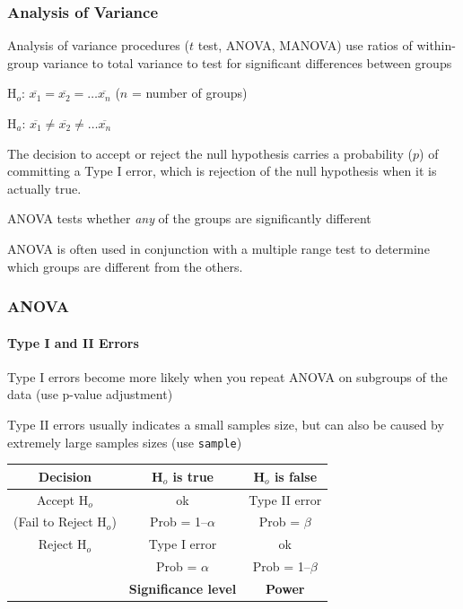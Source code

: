 \documentclass[10pt]{beamer}
\begin{document}
\begin{frame}
\frametitle{Analysis of Variance}

\bi
\item Analysis of variance procedures ($t$ test, ANOVA, MANOVA)
  use ratios of within-group variance to total variance to test for
  significant differences between groups

H$_{o}$: $\overline{x_1} = \overline{x_2} = \ldots \overline{x_n}$ \hspace{3ex} ($n$ = number of groups)

H$_{a}$: $\overline{x_1} \ne \overline{x_2} \ne \ldots \overline{x_n}$ 

\item The decision to accept or reject the null hypothesis carries a
  probability ($p$) of committing a Type I error, which is rejection
  of the null hypothesis when it is actually true.

\item ANOVA tests whether {\em any} of the groups are
significantly different

\item ANOVA is often used in conjunction with a multiple range test to
determine which groups are different from the others.
\ei
\end{frame}


\begin{frame}
\frametitle{ANOVA}
\framesubtitle{Type I and II Errors}

\bi
\item Type I errors become more likely when you repeat ANOVA on
  subgroups of the data (use p-value adjustment)

\item Type II errors usually indicates a small samples size, but can
  also be caused by extremely large samples sizes (use {\color{red}
    \tt sample})

\ei

\vspace{2ex}
\begin{center}
\begin{tabular}{|c|c|c|}\hline
Decision                        & H$_{o}$ is true       & H$_{o}$ is false \\ \hline
Accept H$_{o}$                  & ok                    & Type II error \\
(Fail to Reject H$_{o}$)        & Prob = 1--$\alpha$    & Prob = $\beta$ \\ \hline
Reject H$_{o}$                  & Type I error          & ok\\
                                & Prob = $\alpha$       & Prob = 1--$\beta$\\ \cline{2-3}
                                & {\bf Significance level}      & {\bf Power}\\ \hline
\end{tabular}
\end{center}
\end{frame}
\end{document}
